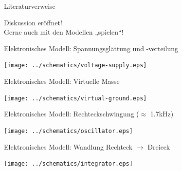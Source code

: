 \documentclass{beamer}
\begin{document}

\begin{frame}[t,allowframebreaks]{Literaturverweise}
  \nocite{Reuter20}
  \printbibliography
\end{frame}

\begin{frame}[t]
  \begin{center}
    \Huge{Diskussion eröffnet!}\\
    \vspace{1cm}
    \large{Gerne auch mit den Modellen „spielen“!}
  \end{center}
\end{frame}



\begin{frame}[fragile]{Elektronisches Modell: Spannungsglättung und -verteilung}
  \begin{center}
    \texttt{[image: ../schematics/voltage-supply.eps]}
  \end{center}
\end{frame}

\begin{frame}[fragile]{Elektronisches Modell: Virtuelle Masse}
  \begin{center}
    \texttt{[image: ../schematics/virtual-ground.eps]}
  \end{center}
\end{frame}

\begin{frame}[fragile]{Elektronisches Modell: Rechteckschwingung ($\approx$ 1.7kHz)}
  \begin{center}
    \texttt{[image: ../schematics/oscillator.eps]}
  \end{center}
\end{frame}

\begin{frame}[fragile]{Elektronisches Modell: Wandlung Rechteck $\rightarrow$ Dreieck}
  \begin{center}
    \texttt{[image: ../schematics/integrator.eps]}
  \end{center}
\end{frame}
\end{document}
